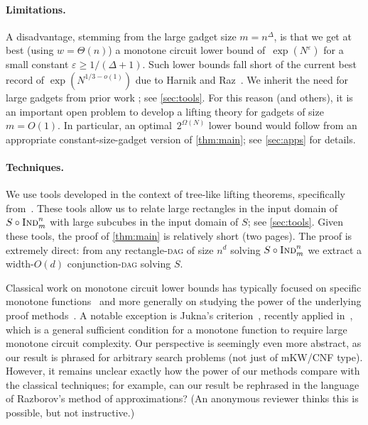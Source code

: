 \documentclass[11pt]{article}
\numberwithin{equation}{section}
\theoremstyle{definition}
\theoremstyle{plain}
\newcommand{\Ind}{\textsc{Ind}}
\newcommand{\DAGspace}{\textsc{dag}\xspace}
\begin{document}
\paragraph{Limitations.}
A disadvantage, stemming from the large gadget size $m=n^\Delta$, is that we get at best (using $w=\Theta(n)$) a monotone circuit lower bound of~$\exp(N^{\varepsilon})$ for a small constant $\varepsilon\geq 1/(\Delta+1)$. Such lower bounds fall short of the current best record of $\exp(N^{1/3-o(1)})$ due to Harnik and Raz~\cite{harnik00higher}. We inherit the need for large gadgets from prior work \cite{goos16rectangles,goos17bpp}; see \autoref{sec:tools}. For this reason (and others), it is an important open problem to develop a lifting theory for gadgets of size $m=O(1)$. In particular, an optimal~$2^{\Omega(N)}$ lower bound would follow from an appropriate constant-size-gadget version of \autoref{thm:main}; see \autoref{sec:apps} for details.


\paragraph{Techniques.}
We use tools developed in the context of tree-like lifting theorems, specifically from~\cite{goos16rectangles,goos17bpp}. These tools allow us to relate large rectangles in the input domain of $S\circ\Ind_m^n$ with large subcubes in the input domain of $S$; see \autoref{sec:tools}. Given these tools, the proof of \autoref{thm:main} is relatively short (two pages). The proof is extremely direct: from any rectangle-\DAGspace of size $n^d$ solving $S\circ \Ind^n_m$ we extract a width-$O(d)$ conjunction-\DAGspace solving $S$.

Classical
%
work     %
on monotone circuit lower bounds
%
has      %
typically focused on specific monotone functions~\cite{razborov85monlower,andreev1985monlower,alon87monlower,haken95bottleneck,rossman14monotone} and more generally on studying the power of the underlying proof methods~\cite{razborov89onthemethod,wigderson93thefusion,razborov97generalapprox,simon97approxbottle,berg99approxbottle,amano04approxbottle}. A notable exception is Jukna's criterion~\cite{jukna97finitelimits}, recently applied in~\cite{hrubes17randomformulas,fleming17randomcnf}, which is a general sufficient condition for a monotone function to require large monotone circuit complexity. Our perspective is seemingly even more abstract, as our result is phrased for arbitrary search problems (not just of mKW/CNF type). However, it remains unclear exactly how the power of our methods compare with the classical techniques; for example, can our result be rephrased in the language of Razborov's method of approximations? (An anonymous reviewer thinks this is possible, but not instructive.)
\end{document}
